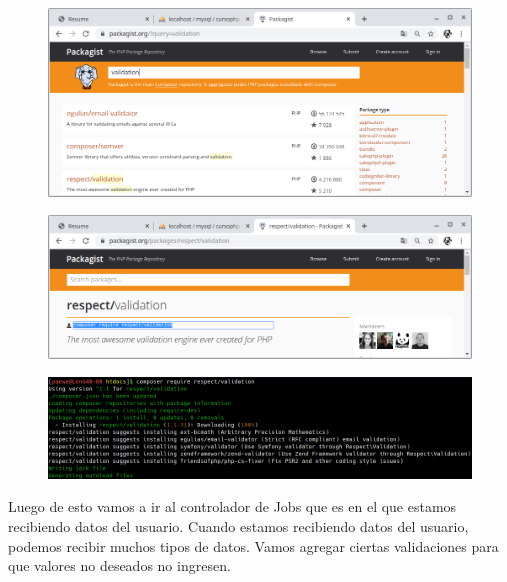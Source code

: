 \documentclass{article}
\begin{document}
\begin{figure}[h!]
  \centering
  \includegraphics[scale=0.5]{./Pictures/162_validation.png}
\end{figure}

\begin{figure}[h!]
  \centering
  \includegraphics[scale=0.5]{./Pictures/163_validation_composer.png}
\end{figure}

\begin{figure}[h!]
  \centering
  \includegraphics[scale=0.70]{./Pictures/163_validation_install.png}
\end{figure}

Luego de esto vamos a ir al controlador de Jobs que es en el que estamos
recibiendo datos del usuario. Cuando estamos recibiendo datos del usuario,
podemos recibir muchos tipos de datos. Vamos agregar ciertas validaciones para
que valores no deseados no ingresen.\\

\newpage
\end{document}
